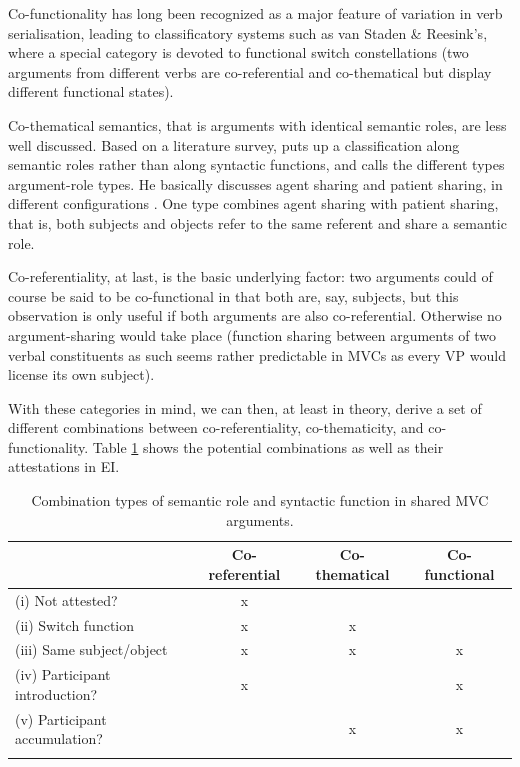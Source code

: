 Co-functionality has long been recognized as a major feature of variation in verb serialisation, leading to classificatory systems such as van Staden \& Reesink's, where a special category is devoted to functional switch constellations (two arguments from different verbs are co-referential and co-thematical but display different functional states). 

Co-thematical semantics, that is arguments with identical semantic roles, are less well discussed. Based on a literature survey, \citet{haspelmath2016serial} puts up a classification along semantic roles rather than along syntactic functions, and calls the different types argument-role types. He basically discusses agent sharing and patient sharing, in different configurations \citep[3ff.]{haspelmath2016serial}. One type combines agent sharing with patient sharing, that is, both subjects and objects refer to the same referent and share a semantic role.

Co-referentiality, at last, is the basic underlying factor: two arguments could of course be said to be co-functional in that both are, say, subjects, but this observation is only useful if both arguments are also co-referential. Otherwise no argument-sharing would take place (function sharing between arguments of two verbal constituents as such seems rather predictable in MVCs as every VP would license its own subject). 

With these categories in mind, we can then, at least in theory, derive a set of different combinations between co-referentiality, co-thematicity, and co-functionality. Table \ref{table:Combination_role-function} shows the potential combinations as well as their attestations in EI.

\begin{table}
\begin{footnotesize}
\begin{tabular}{lccc}
  \lsptoprule
  & {Co-referential} &{Co-thematical} & {Co-functional} \tabularnewline 
  \hline
(i) Not attested? & \cellcolor[gray]{.8} x & & \tabularnewline
(ii) Switch function & \cellcolor[gray]{.8} x & \cellcolor[gray]{.8} x & \tabularnewline
(iii) Same subject/object & \cellcolor[gray]{.8} x & \cellcolor[gray]{.8} x & \cellcolor[gray]{.8} x \tabularnewline
(iv) Participant introduction? & \cellcolor[gray]{.8} x & & \cellcolor[gray]{.8} x \tabularnewline
(v) Participant accumulation? & & \cellcolor[gray]{.8} x & \cellcolor[gray]{.8} x \tabularnewline
   \lspbottomrule
\end{tabular}
\end{footnotesize}
\caption[Combination types of semantic role and syntactic function in shared MVC arguments]{Combination types of semantic role and syntactic function in shared MVC arguments.}
\label{table:Combination_role-function}
\end{table}

